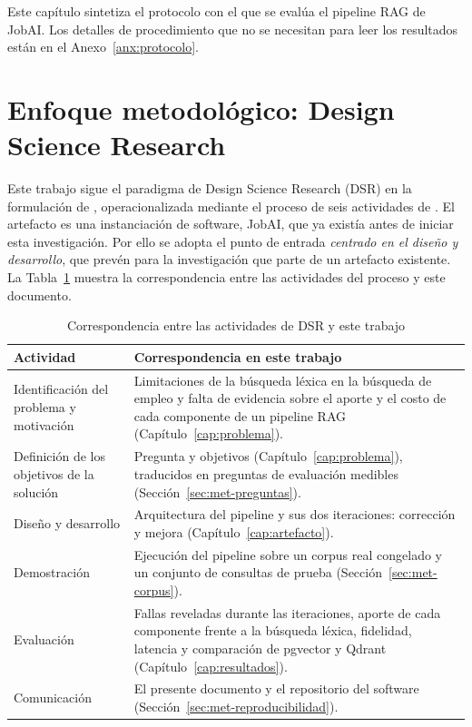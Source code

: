 Este capítulo sintetiza el protocolo con el que se evalúa el pipeline RAG de JobAI. Los detalles de procedimiento que no se necesitan para leer los resultados están en el Anexo~\ref{anx:protocolo}.

\section{Enfoque metodológico: Design Science Research}
\label{sec:met-dsr}

Este trabajo sigue el paradigma de Design Science Research (DSR) en la formulación de \citet{Hevner2004}, operacionalizada mediante el proceso de seis actividades de \citet{Peffers2007}. El artefacto es una instanciación de software, JobAI, que ya existía antes de iniciar esta investigación. Por ello se adopta el punto de entrada \emph{centrado en el diseño y desarrollo}, que \citet{Peffers2007} prevén para la investigación que parte de un artefacto existente. La Tabla~\ref{tab:met-peffers} muestra la correspondencia entre las actividades del proceso y este documento.

\begin{table}[htbp!]
    \centering
    \caption{Correspondencia entre las actividades de DSR \citep{Peffers2007} y este trabajo}
    \label{tab:met-peffers}
    \small
    \begin{tabular}{|p{4.2cm}|p{10cm}|}
        \hline
        \textbf{Actividad} & \textbf{Correspondencia en este trabajo} \\
        \hline
        Identificación del problema y motivación & Limitaciones de la búsqueda léxica en la búsqueda de empleo y falta de evidencia sobre el aporte y el costo de cada componente de un pipeline RAG (Capítulo~\ref{cap:problema}). \\
        \hline
        Definición de los objetivos de la solución & Pregunta y objetivos (Capítulo~\ref{cap:problema}), traducidos en preguntas de evaluación medibles (Sección~\ref{sec:met-preguntas}). \\
        \hline
        Diseño y desarrollo & Arquitectura del pipeline y sus dos iteraciones: corrección y mejora (Capítulo~\ref{cap:artefacto}). \\
        \hline
        Demostración & Ejecución del pipeline sobre un corpus real congelado y un conjunto de consultas de prueba (Sección~\ref{sec:met-corpus}). \\
        \hline
        Evaluación & Fallas reveladas durante las iteraciones, aporte de cada componente frente a la búsqueda léxica, fidelidad, latencia y comparación de pgvector y Qdrant (Capítulo~\ref{cap:resultados}). \\
        \hline
        Comunicación & El presente documento y el repositorio del software (Sección~\ref{sec:met-reproducibilidad}). \\
        \hline
    \end{tabular}
\end{table}

